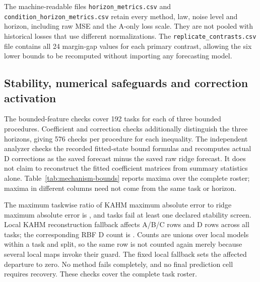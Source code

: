 The machine-readable files \texttt{horizon\_metrics.csv} and
\texttt{condition\_horizon\_metrics.csv} retain every method, law, noise
level and horizon, including raw MSE and the A-only loss scale. They are not
pooled with historical losses that use different normalizations. The
\texttt{replicate\_contrasts.csv} file contains all 24 margin-gap values for
each primary contrast, allowing the six lower bounds to be recomputed without
importing any forecasting model.

\subsection{Stability, numerical safeguards and correction activation}

The bounded-feature checks cover 192 tasks for each of three bounded
procedures. Coefficient and correction checks additionally distinguish the
three horizons, giving 576 checks per procedure for each inequality. The
independent analyzer checks the recorded fitted-state bound formulas and
recomputes actual D corrections as the saved forecast minus the saved raw
ridge forecast. It does not claim to reconstruct the fitted coefficient
matrices from summary statistics alone. Table~\ref{tab:mechanism-bounds}
reports maxima over the complete roster; maxima in different columns need
not come from the same task or horizon.

\begin{table}[!htbp]
\centering\small
\setlength{\tabcolsep}{5pt}
\caption{Observed ratios to the deterministic bounded-feature and
ridge-readout limits. Feature ratios concern the common block for the
common procedure and the respective departure block for the two appended
procedures; the readout bound uses the complete concatenated feature radius.
A zero correction with a zero bound contributes ratio zero. ``Violations''
sums failed feature, coefficient and correction checks at the fixed numerical
tolerances. These are implementation checks, not confidence intervals for
forecast risk.}
\label{tab:mechanism-bounds}

\end{table}

The maximum taskwise ratio of KAHM maximum absolute error to ridge maximum
absolute error is \RMMaxErrorRatio{}, and \RMStabilityFailures{} tasks fail
at least one declared stability screen. Local KAHM reconstruction fallback
affects \RMKFallbackABC{} A/B/C rows and \RMKFallbackD{} D rows across all
tasks; the corresponding RBF D count is \RMRFallbackD{}. Counts are unions
over local models within a task and split, so the same row is not counted
again merely because several local maps invoke their guard. The fixed local
fallback sets the affected departure to zero. No method fails completely, and no final prediction cell requires
recovery. These checks cover the complete task roster.

